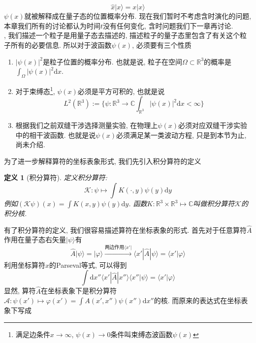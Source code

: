 \documentclass[a4paper,11pt]{book}
\newtheorem{definition}{\hspace{2em}定义}[section]
\newcommand{\A}{\hat{A}}
\newcommand{\md}{\mathrm{d}}
\newcommand{\x}{\hat{x}}
\begin{document}
\begin{equation*}
  \x|x\rangle=x|x\rangle
\end{equation*}
$\psi(x)$就被解释成在量子态的位置概率分布. 现在我们暂时不考虑含时演化的问题, 本章我们所有的讨论都认为时间$t$没有任何变化, 含时问题我们下一章再讨论.\\
, 我们描述一个粒子是用量子态去描述的, 描述粒子的量子态里包含了有关这个粒子所有的必要信息. 所以对于波函数$\psi(x)$, 必须要有三个性质
\begin{enumerate}
  \item $|\psi(x)|^2$是粒子位置的概率分布. 也就是说, 粒子在空间$\Omega\subset\mathbb{R}^3$的概率是$\int_{\Omega}|\psi(x)|^2\md x$.
  \item 对于束缚态\footnote{满足边条件$x\to\infty$, $\psi(x)\to0$条件叫束缚态波函数$\psi(x)$}, $\psi(x)$必须是平方可积的, 也就是说
  \begin{equation*}
    L^2(\mathbb{R}^3):=\{\psi:\mathbb{R}^3\to\mathbb{C}\int_{\mathbb{R}^3}|\psi(x)|^2\md x
    <\infty\}
  \end{equation*}
  \item 根据我们之前双缝干涉选择测量实验, 在物理上$\psi(x)$必须对应双缝干涉实验中的相干波函数. 也就是说$\psi(x)$必须满足某一类波动方程, 只是到本节为止, 尚未介绍.
\end{enumerate}
为了进一步解释算符的坐标表象形式, 我们先引入积分算符的定义
\begin{definition}[积分算符]
  定义积分算符:
  \begin{equation*}
    \mathcal{K}:\psi\mapsto\int K(\cdot,y)\psi(y)\md y
  \end{equation*}
  例如$(\mathcal{K}\psi)(x)=\int K(x,y)\psi(y)\md y$. 函数$K:\mathbb{R}^3\times\mathbb{R}^3\mapsto\mathbb{C}$叫做积分算符$\mathcal{K}$的积分核.
\end{definition}
有了积分算符的定义, 我们很容易描述算符在坐标表象的形式. 首先对于任意算符$\A$作用在量子态右矢量$|\psi\rangle$有
\begin{equation*}
  \A|\psi\rangle=|\varphi\rangle\xrightarrow{\text{两边作用$\langle x'|$}}\langle x'|\A|\psi\rangle=\langle x'|\varphi\rangle
\end{equation*}
利用坐标算符$\x$的Parseval等式, 可以得到
\begin{equation*}
  \int\md x''\langle x'|\A|x''\rangle\langle x''|\psi\rangle=\langle x'|\varphi\rangle
\end{equation*}
显然, 算符$\A$在坐标表象下是积分算符$\mathcal{A}:\psi(x')\mapsto\varphi(x')=\int A(x',x'')\psi(x'')\md x''$的核. 而原来的表达式在坐标表象下写成
\end{document}

